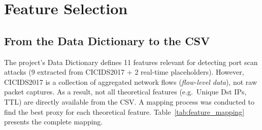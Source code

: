 \documentclass[12pt,a4paper]{report}
\begin{document}
\section{Feature Selection}

\subsection{From the Data Dictionary to the CSV}

The project's Data Dictionary defines 11 features relevant for detecting port scan attacks (9 extracted from CICIDS2017 + 2 real-time placeholders). However, CICIDS2017 is a collection of aggregated network flows (\textit{flow-level data}), not raw packet captures. As a result, not all theoretical features (e.g.\ Unique Dst IPs, TTL) are directly available from the CSV. A mapping process was conducted to find the best proxy for each theoretical feature. Table~\ref{tab:feature_mapping} presents the complete mapping.
\end{document}
